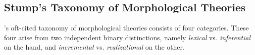 \subsection{Stump's Taxonomy of Morphological Theories}
\cite{stump:2001}'s oft-cited taxonomy of morphological theories 
consists of four categories. These four arise from two independent 
binary distinctions, namely \emph{lexical} vs. \emph{inferential} on the hand, and \emph{incremental} vs. \emph{realizational} on the other.
 
